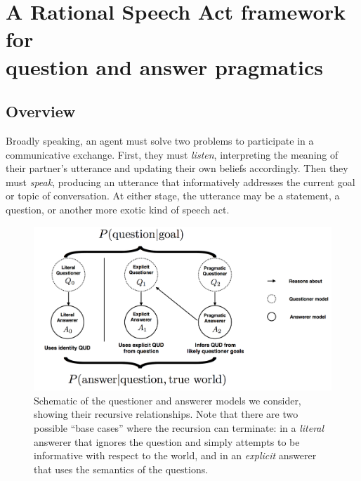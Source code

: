 \documentclass[11pt, floatsintext]{apa6}
\begin{document}
\section{A Rational Speech Act framework for \\ question and answer pragmatics}

\subsection{Overview}

Broadly speaking, an agent must solve two problems to participate in a communicative exchange. 
First, they must \emph{listen}, interpreting the meaning of their partner's utterance and updating their own beliefs accordingly. 
Then they must \emph{speak}, producing an utterance that informatively addresses the current goal or topic of conversation. 
At either stage, the utterance may be a statement, a question, or another more exotic kind of speech act. 

\begin{figure}[t]
\begin{center}
\includegraphics[scale = .5]{models.png}
\end{center}
\caption{Schematic of the questioner and answerer models we consider, showing their recursive relationships. Note that there are two possible ``base cases'' where the recursion can terminate: in a \emph{literal} answerer that ignores the question and simply attempts to be informative with respect to the world, and in an \emph{explicit} answerer that uses the semantics of the questions.}
\label{fig:models}
\end{figure}
\end{document}
